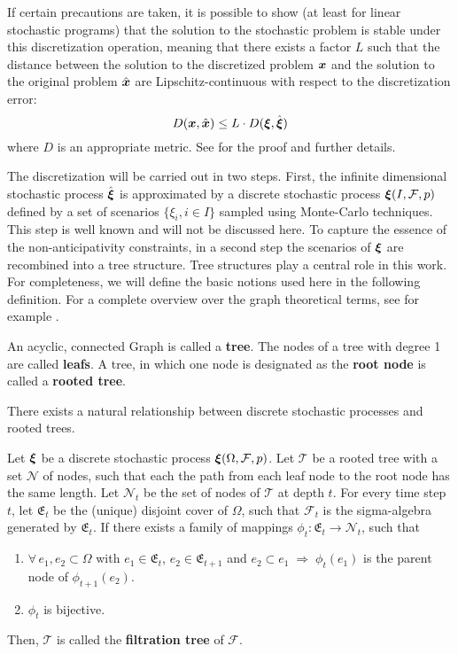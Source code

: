 If certain precautions are taken, it is possible to show (at least for linear stochastic programs) that the solution to the stochastic problem is stable under this discretization operation, meaning that there exists a factor $L$ such that the distance between the solution to the discretized problem $\boldsymbol x$ and the solution to the original problem $\hat{\boldsymbol x}$ are Lipschitz-continuous with respect to the discretization error:
\begin{equation}
  D(\boldsymbol x , \hat{\boldsymbol x}) \leq L\cdot D(\boldsymbol\xi,\hat{\boldsymbol\xi})
\end{equation}
where $D$ is an appropriate metric. See  for the proof and further details.

The discretization will be carried out in two steps.
First, the infinite dimensional stochastic process $\hat{\boldsymbol\xi}$ is approximated by a discrete stochastic process $\boldsymbol\xi(I,\mathcal{F},p)$ defined by a set of scenarios $\{\xi_i, i\in I\}$  sampled using Monte-Carlo techniques.
This step is well known and will not be discussed here.
To capture the essence of the non-anticipativity constraints, in a second step the scenarios of $\boldsymbol\xi$ are recombined into a tree structure.
Tree structures play a central role in this work.
For completeness, we will define the basic notions used here in the following definition.
For a complete overview over the graph theoretical terms, see for example .
\begin{definition}
  \label{def:tree}
  An acyclic, connected Graph is called a \textbf{tree}.
  The nodes of a tree with degree 1 are called \textbf{leafs}.
  A tree, in which one node is designated as the \textbf{root node} is called a \textbf{rooted tree}.
\end{definition}
There exists a natural relationship between discrete stochastic processes and rooted trees.
\begin{definition}
  \label{def:filtration_tree}
  Let $\boldsymbol\xi$ be a discrete stochastic process $\boldsymbol\xi(\Omega, \mathcal{F}, p)$.
  Let $\mathcal{T}$ be a rooted tree with a set $\mathcal{N}$ of nodes, such that each the path from each leaf node to the root node has the same length.
  Let $\mathcal{N}_t$ be the set of nodes of $\mathcal{T}$ at depth $t$.
  For every time step $t$, let $\mathfrak{E}_t$ be the (unique) disjoint cover of $\Omega$, such that $\mathcal{F}_t$ is the sigma-algebra generated by $\mathfrak{E}_t$.
  If there exists a family of mappings $\phi_t:\mathfrak{E}_t\rightarrow \mathcal{N}_t$, such that
  \begin{enumerate}
  \item  $\forall\, e_1,e_2\subset \Omega$ with $e_1\in\mathfrak{E}_t$, $e_2\in\mathfrak{E}_{t+1}$ and $e_2\subset e_1\;\Rightarrow\;\phi_t(e_1)$ is the parent node of $\phi_{t+1}(e_2)$.
  \item $\phi_t$ is bijective.
  \end{enumerate}
  Then, $\mathcal{T}$ is called the \textbf{filtration tree} of $\mathcal{F}$.
\end{definition}

